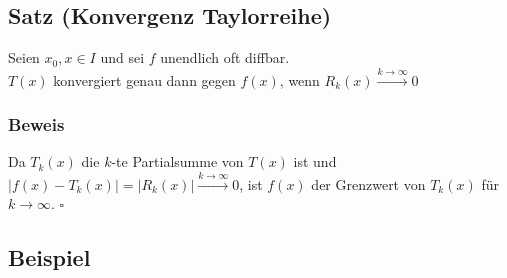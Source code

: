 \documentclass[a4paper, 12pt,titlepage, pdf, headsepline]{article}
\newcommand{\qed}{\hfill$\square$}
\renewcommand{\>}{\rightarrow}
\renewcommand{\*}{\cdot}
\begin{document}
\subsection{Satz (Konvergenz Taylorreihe)}
\label{12.8}
Seien $x_0, x \in I$ und sei $f$ unendlich oft diffbar. \\
$T(x)$ konvergiert genau dann gegen $f(x)$, wenn $R_k(x) \overset{k \rightarrow \infty}{\rightarrow} 0$
\subsubsection*{Beweis}
Da $T_k(x)$ die $k$-te Partialsumme von $T(x)$ ist und $|f(x) - T_k(x)| = |R_k(x)| \overset{k \rightarrow \infty}{\rightarrow} 0$, ist $f(x)$ der Grenzwert von $T_k(x)$ für $k \rightarrow \infty$. \qed
\subsection{Beispiel}
\end{document}
